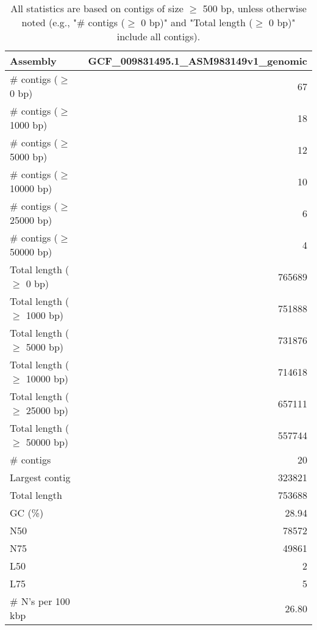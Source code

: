 \documentclass[12pt,a4paper]{article}
\begin{document}
\begin{table}[ht]
\begin{center}
\caption{All statistics are based on contigs of size $\geq$ 500 bp, unless otherwise noted (e.g., "\# contigs ($\geq$ 0 bp)" and "Total length ($\geq$ 0 bp)" include all contigs).}
\begin{tabular}{|l*{1}{|r}|}
\hline
Assembly & GCF\_009831495.1\_ASM983149v1\_genomic \\ \hline
\# contigs ($\geq$ 0 bp) & 67 \\ \hline
\# contigs ($\geq$ 1000 bp) & 18 \\ \hline
\# contigs ($\geq$ 5000 bp) & 12 \\ \hline
\# contigs ($\geq$ 10000 bp) & 10 \\ \hline
\# contigs ($\geq$ 25000 bp) & 6 \\ \hline
\# contigs ($\geq$ 50000 bp) & 4 \\ \hline
Total length ($\geq$ 0 bp) & 765689 \\ \hline
Total length ($\geq$ 1000 bp) & 751888 \\ \hline
Total length ($\geq$ 5000 bp) & 731876 \\ \hline
Total length ($\geq$ 10000 bp) & 714618 \\ \hline
Total length ($\geq$ 25000 bp) & 657111 \\ \hline
Total length ($\geq$ 50000 bp) & 557744 \\ \hline
\# contigs & 20 \\ \hline
Largest contig & 323821 \\ \hline
Total length & 753688 \\ \hline
GC (\%) & 28.94 \\ \hline
N50 & 78572 \\ \hline
N75 & 49861 \\ \hline
L50 & 2 \\ \hline
L75 & 5 \\ \hline
\# N's per 100 kbp & 26.80 \\ \hline
\end{tabular}
\end{center}
\end{table}
\end{document}
